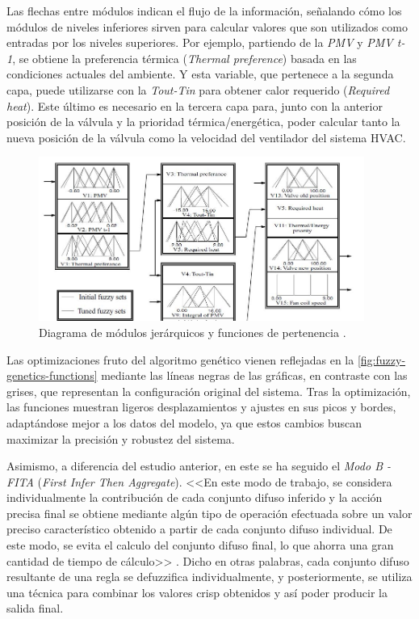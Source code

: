 Las flechas entre módulos indican el flujo de la información, señalando cómo los módulos de niveles inferiores sirven para calcular valores que son utilizados como entradas por los niveles superiores. Por ejemplo, partiendo de la \textit{PMV} y \textit{PMV t-1}, se obtiene la preferencia térmica (\textit{Thermal preference}) basada en las condiciones actuales del ambiente. Y esta variable, que pertenece a la segunda capa, puede utilizarse con la \textit{Tout-Tin} para obtener calor requerido (\textit{Required heat}). Este último es necesario en la tercera capa para, junto con la anterior posición de la válvula y la prioridad térmica/energética, poder calcular tanto la nueva posición de la válvula como la velocidad del ventilador del sistema HVAC.

\begin{figure}[H]
	\centering
	\includegraphics[width=0.95\textwidth]{imgs/fuzzy-genetics-functions.JPG}
	\caption{Diagrama de módulos jerárquicos y funciones de pertenencia \parencite{alcala2003fuzzy}.}
	\label{fig:fuzzy-genetics-functions}
\end{figure}

Las optimizaciones fruto del algoritmo genético vienen reflejadas en la \autoref{fig:fuzzy-genetics-functions} mediante las líneas negras de las gráficas, en contraste con las grises, que representan la configuración original del sistema. Tras la optimización, las funciones muestran ligeros desplazamientos y ajustes en sus picos y bordes, adaptándose mejor a los datos del modelo, ya que estos cambios buscan maximizar la precisión y robustez del sistema.

Asimismo, a diferencia del estudio anterior, en este se ha seguido el \textit{Modo B - FITA} (\textit{First Infer Then Aggregate}). <<En este modo de trabajo, se considera individualmente la contribución de cada conjunto difuso inferido y la acción precisa final se obtiene mediante algún tipo de operación efectuada sobre un valor preciso
característico obtenido a partir de cada conjunto difuso individual. De este modo, se
evita el calculo del conjunto difuso final, lo que ahorra una gran cantidad de
tiempo de cálculo>> \parencite{peregrin2000integracion}. Dicho en otras palabras, cada conjunto difuso resultante de una regla se defuzzifica individualmente, y posteriormente, se utiliza una técnica para combinar los valores crisp obtenidos y así poder producir la salida final.

